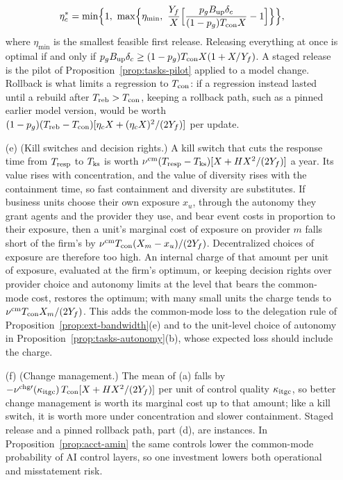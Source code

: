 \begin{proposition}
\begin{enumerate}
\[
\eta_c^*=\min\Bigl\{1,\ \max\Bigl\{\eta_{\min},\ \frac{Y_f}X\Bigl[\frac{p_gB_{\rm up}\delta_c}{(1-p_g)T_{\rm con}X}-1\Bigr]\Bigr\}\Bigr\},
\]
where $\eta_{\min}$ is the smallest feasible first release. Releasing everything at once is optimal if and only if $p_gB_{\rm up}\delta_c\ge(1-p_g)T_{\rm con}X(1+X/Y_f)$. A staged release is the pilot of Proposition~\ref{prop:tasks-pilot} applied to a model change. Rollback is what limits a regression to $T_{\rm con}$: if a regression instead lasted until a rebuild after $T_{\rm reb}>T_{\rm con}$, keeping a rollback path, such as a pinned earlier model version, would be worth $(1-p_g)(T_{\rm reb}-T_{\rm con})[\eta_cX+(\eta_cX)^2/(2Y_f)]$ per update.
\item[(e)] (Kill switches and decision rights.) A kill switch that cuts the response time from $T_{\rm resp}$ to $T_{\rm ks}$ is worth $\nu^{\rm cm}(T_{\rm resp}-T_{\rm ks})[X+HX^2/(2Y_f)]$ a year. Its value rises with concentration, and the value of diversity rises with the containment time, so fast containment and diversity are substitutes. If business units choose their own exposure $x_u$, through the autonomy they grant agents and the provider they use, and bear event costs in proportion to their exposure, then a unit's marginal cost of exposure on provider $m$ falls short of the firm's by $\nu^{\rm cm}T_{\rm con}(X_m-x_u)/(2Y_f)$. Decentralized choices of exposure are therefore too high. An internal charge of that amount per unit of exposure, evaluated at the firm's optimum, or keeping decision rights over provider choice and autonomy limits at the level that bears the common-mode cost, restores the optimum; with many small units the charge tends to $\nu^{\rm cm}T_{\rm con}X_m/(2Y_f)$. This adds the common-mode loss to the delegation rule of Proposition~\ref{prop:ext-bandwidth}(e) and to the unit-level choice of autonomy in Proposition~\ref{prop:tasks-autonomy}(b), whose expected loss should include the charge.
\item[(f)] (Change management.) The mean of (a) falls by $-\nu^{\rm chg\prime}(\kappa_{\rm itgc})\,T_{\rm con}[X+HX^2/(2Y_f)]$ per unit of control quality $\kappa_{\rm itgc}$, so better change management is worth its marginal cost up to that amount; like a kill switch, it is worth more under concentration and slower containment. Staged release and a pinned rollback path, part (d), are instances. In Proposition~\ref{prop:acct-amin} the same controls lower the common-mode probability of AI control layers, so one investment lowers both operational and misstatement risk.
\end{enumerate}
\end{proposition}


